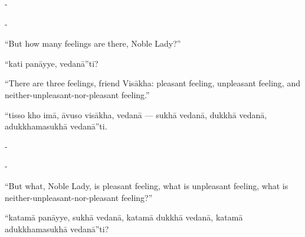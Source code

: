 \begin{samepage}
\begin{leftcolumn*}
-
\end{leftcolumn*}

\begin{rightcolumn}
-
\end{rightcolumn}
\end{samepage}

\begin{samepage}
\begin{leftcolumn*}
“But how many feelings are there, Noble Lady?”
\end{leftcolumn*}

\begin{rightcolumn}
“kati panāyye, vedanā”ti?
\end{rightcolumn}
\end{samepage}

\begin{samepage}
\begin{leftcolumn*}
“There are three feelings, friend Visākha: pleasant feeling, unpleasant feeling, and neither-unpleasant-nor-pleasant feeling.”
\end{leftcolumn*}

\begin{rightcolumn}
“tisso kho imā, āvuso visākha, vedanā — sukhā vedanā, dukkhā vedanā, adukkhamasukhā vedanā”ti.
\end{rightcolumn}
\end{samepage}

\begin{samepage}
\begin{leftcolumn*}
-
\end{leftcolumn*}

\begin{rightcolumn}
-
\end{rightcolumn}
\end{samepage}

\begin{samepage}
\begin{leftcolumn*}
“But what, Noble Lady, is pleasant feeling, what is unpleasant feeling, what is neither-unpleasant-nor-pleasant feeling?”
\end{leftcolumn*}

\begin{rightcolumn}
“katamā panāyye, sukhā vedanā, katamā dukkhā vedanā, katamā adukkhamasukhā vedanā”ti?
\end{rightcolumn}
\end{samepage}

